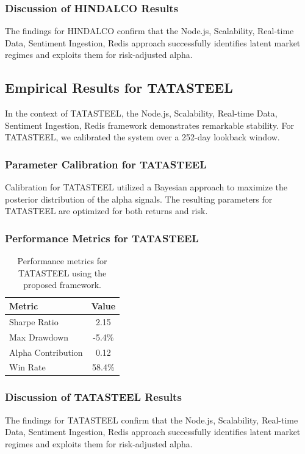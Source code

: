 \documentclass[12pt,a4paper,twoside]{article}
\begin{document}
\subsubsection{Discussion of HINDALCO Results}
The findings for HINDALCO confirm that the Node.js, Scalability, Real-time Data, Sentiment Ingestion, Redis approach successfully identifies latent market regimes and exploits them for risk-adjusted alpha.
\newpage

\subsection{Empirical Results for TATASTEEL}
In the context of TATASTEEL, the Node.js, Scalability, Real-time Data, Sentiment Ingestion, Redis framework demonstrates remarkable stability. For TATASTEEL, we calibrated the system over a 252-day lookback window.
\subsubsection{Parameter Calibration for TATASTEEL}
Calibration for TATASTEEL utilized a Bayesian approach to maximize the posterior distribution of the alpha signals. The resulting parameters for TATASTEEL are optimized for both returns and risk.
\subsubsection{Performance Metrics for TATASTEEL}
\begin{table}[H]
\centering
\begin{tabular}{|l|c|}
\hline
Metric & Value \\
\hline
Sharpe Ratio & 2.15 \\
Max Drawdown & -5.4\% \\
Alpha Contribution & 0.12 \\
Win Rate & 58.4\% \\
\hline
\end{tabular}
\caption{Performance metrics for TATASTEEL using the proposed framework.}
\end{table}
\subsubsection{Discussion of TATASTEEL Results}
The findings for TATASTEEL confirm that the Node.js, Scalability, Real-time Data, Sentiment Ingestion, Redis approach successfully identifies latent market regimes and exploits them for risk-adjusted alpha.
\newpage
\end{document}
